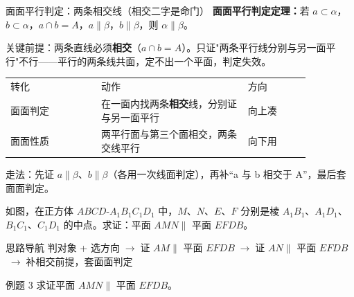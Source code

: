\documentclass{exam-zh}
\begin{document}
\clearpage
{}


\begin{eduSolutionBox}{面面平行判定：两条相交线（相交二字是命门）}
  \begingroup
  \setlength{\parskip}{2.5mm}
\textbf{面面平行判定定理：}若 $a\subset\alpha$，$b\subset\alpha$，$a\cap b=A$，$a\parallel\beta$，$b\parallel\beta$，则 $\alpha\parallel\beta$。\par
关键前提：两条直线必须\textbf{相交}（$a\cap b=A$）。只证"两条平行线分别与另一面平行"不行——平行的两条线共面，定不出一个平面，判定失效。\par
\begin{tabular}{p{0.26\linewidth}p{0.42\linewidth}p{0.18\linewidth}}
转化 & 动作 & 方向\\
面面判定 & 在一面内找两条\textbf{相交}线，分别证与另一面平行 & 向上凑\\
面面性质 & 两平行面与第三个面相交，两条交线平行 & 向下用\\
\end{tabular}
\par
走法：先证 $a\parallel\beta$、$b\parallel\beta$（各用一次线面判定），再补“a 与 b 相交于 A”，最后套面面判定。\par
  \endgroup
\end{eduSolutionBox}




\begin{eduProblemBlock}[例题 3]
如图，在正方体 $ABCD$-$A_{1}B_{1}C_{1}D_{1}$ 中，$M$、$N$、$E$、$F$ 分别是棱 $A_{1}B_{1}$、$A_{1}D_{1}$、$B_{1}C_{1}$、$C_{1}D_{1}$ 的中点。求证：平面 $AMN\parallel$ 平面 $EFDB$。

\end{eduProblemBlock}





\begin{eduAuxItem}{思路导航}
判对象 + 选方向$\;\to\;$证 $AM\parallel$ 平面 $EFDB$$\;\to\;$证 $AN\parallel$ 平面 $EFDB$$\;\to\;$补相交前提，套面面判定\end{eduAuxItem}




\begin{eduSubQuestionItem}{例题 3}
求证平面 $AMN\parallel$ 平面 $EFDB$。\end{eduSubQuestionItem}
\end{document}
